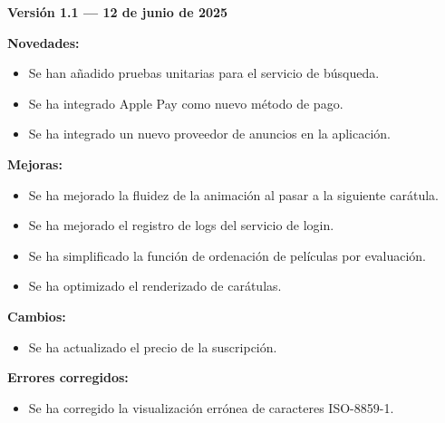 \begin{solucion}
    \textbf{Versión 1.1 — 12 de junio de 2025}

    \textbf{Novedades:}
    \begin{itemize}
        \item Se han añadido pruebas unitarias para el servicio de búsqueda.
        \item Se ha integrado Apple Pay como nuevo método de pago.
        \item Se ha integrado un nuevo proveedor de anuncios en la aplicación.
    \end{itemize}

    \textbf{Mejoras:}
    \begin{itemize}
        \item Se ha mejorado la fluidez de la animación al pasar a la siguiente carátula.
        \item Se ha mejorado el registro de logs del servicio de login.
        \item Se ha simplificado la función de ordenación de películas por evaluación.
        \item Se ha optimizado el renderizado de carátulas.
    \end{itemize}

    \textbf{Cambios:}
    \begin{itemize}
        \item Se ha actualizado el precio de la suscripción.
    \end{itemize}

    \textbf{Errores corregidos:}
    \begin{itemize}
        \item Se ha corregido la visualización errónea de caracteres ISO-8859-1.
    \end{itemize}
\end{solucion}
